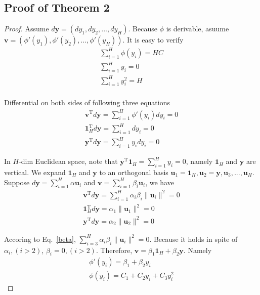 \documentclass{article}
\newcommand*{\vect}[1]{\textbf{#1}}
\begin{document}
\clearpage
\subsection{Proof of Theorem 2}

\begin{proof}
Assume $d\vect{y}=(dy_1, dy_2, ..., dy_H)$. Because $\phi$ is derivable, asuume $\vect{v}=(\phi'(y_1), \phi'(y_2), ..., \phi'(y_H))$. It is easy to verify
\begin{equation}
\begin{aligned}
\sum\limits_{i=1}^H\phi(y_i)=HC\\
\sum\limits_{i=1}^Hy_i=0\\
\sum\limits_{i=1}^Hy_i^2=H\\
\end{aligned}
\end{equation}

Differential on both sides of following three equations
\begin{align}
\vect{v}^\text{T}d\vect{y}=\sum\limits_{i=1}^H\phi'(y_i)dy_i=0\\
\vect{1}_H^\text{T}d\vect{y}=\sum\limits_{i=1}^Hdy_i=0\label{dy1}\\
\vect{y}^\text{T}d\vect{y}=\sum\limits_{i=1}^H y_idy_i=0\label{dy2}
\end{align}

In $H$-dim Euclidean space, note that $\vect{y}^\text{T}\vect{1}_H=\sum\limits_{i=1}^Hy_i=0$, namely $\vect{1}_H$ and $\vect{y}$ are vertical. We expand $\vect{1}_H$ and $\vect{y}$ to an orthogonal basis $\vect{u}_1=\vect{1}_H, \vect{u}_2=\vect{y}, \vect{u}_3, ..., \vect{u}_{H}$. Suppose $d\vect{y}=\sum\limits_{i=1}^H\alpha\vect{u}_i$ and $\vect{v}=\sum\limits_{i=1}^H\beta_i\vect{u}_i$, we have
\begin{equation}\begin{aligned}
\vect{v}^\text{T}d\vect{y}=\sum\limits_{i=1}^H\alpha_i\beta_i\|\vect{u}_i\|^2=0\label{beta}\\
\vect{1}_H^\text{T}d\vect{y}=\alpha_1\|\vect{u}_1\|^2=0\\
\vect{y}^\text{T}d\vect{y}=\alpha_2\|\vect{u}_2\|^2=0
\end{aligned}\end{equation}

Accoring to Eq.~\ref{beta}, $\sum\limits_{i=3}^H\alpha_i\beta_i\|\vect{u}_i\|^2=0$. Because it holds in spite of $\alpha_i, (i>2)$, $\beta_i=0, (i>2)$. Therefore, $\vect{v}=\beta_1\vect{1}_H+\beta_2\vect{y}$. Namely
\begin{equation}\begin{aligned}
\phi'(y_i)=\beta_1+\beta_2y_i\\
\phi(y_i)=C_1+C_2y_i+C_3y_i^2
\end{aligned}\end{equation}


\end{proof}
\end{document}
